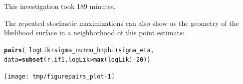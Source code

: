 \documentclass{beamer}\usepackage[]{graphicx}\usepackage[]{color}
\makeatletter
\newcommand{\hlnum}[1]{\textcolor[rgb]{0.686,0.059,0.569}{#1}}%
\newcommand{\hlopt}[1]{\textcolor[rgb]{0,0,0}{#1}}%
\newcommand{\hlstd}[1]{\textcolor[rgb]{0.345,0.345,0.345}{#1}}%
\newcommand{\hlkwc}[1]{\textcolor[rgb]{0.333,0.667,0.333}{#1}}%
\newcommand{\hlkwd}[1]{\textcolor[rgb]{0.737,0.353,0.396}{\textbf{#1}}}%
\newenvironment{kframe}{%
 \def\at@end@of@kframe{}%
 \ifinner\ifhmode%
  \def\at@end@of@kframe{\end{minipage}}%
  \begin{minipage}{\columnwidth}%
 \fi\fi%
 \def\FrameCommand##1{\hskip\@totalleftmargin \hskip-\fboxsep
 \colorbox{shadecolor}{##1}\hskip-\fboxsep
     \hskip-\linewidth \hskip-\@totalleftmargin \hskip\columnwidth}%
 \MakeFramed {\advance\hsize-\width
   \@totalleftmargin\z@ \linewidth\hsize
   \@setminipage}}%
 {\par\unskip\endMakeFramed%
 \at@end@of@kframe}
\newenvironment{knitrout}{}{} %
\makeatother
\begin{document}
\begin{frame}[fragile]

\bi

\item This investigation took  189 minutes. 

\item The repeated stochastic maximizations can also show us the geometry of the likelihood surface in a neighborhood of this point estimate:

\ei

\begin{knitrout}\small
{}\color{fgcolor}\begin{kframe}
\begin{alltt}
\hlkwd{pairs}\hlstd{(}\hlopt{~}\hlstd{logLik}\hlopt{+}\hlstd{sigma_nu}\hlopt{+}\hlstd{mu_h}\hlopt{+}\hlstd{phi}\hlopt{+}\hlstd{sigma_eta,}
  \hlkwc{data}\hlstd{=}\hlkwd{subset}\hlstd{(r.if1,logLik}\hlopt{>}\hlkwd{max}\hlstd{(logLik)}\hlopt{-}\hlnum{20}\hlstd{))}
\end{alltt}
\end{kframe}
\end{knitrout}

\vspace{-5mm}

\begin{knitrout}\small
{}\color{fgcolor}

{\centering \texttt{[image: tmp/figurepairs\_plot-1]} 

}



\end{knitrout}

\end{frame}
\end{document}
